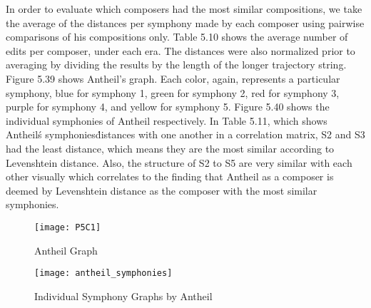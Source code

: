 In order to evaluate which composers had the most similar compositions, we take the average of the distances per symphony made by each composer using pairwise comparisons of his compositions only. Table 5.10 shows the average number of edits per composer, under each era. The distances were also normalized prior to averaging by dividing the results by the length of the longer trajectory string. Figure 5.39 shows Antheil's graph. Each color, again, represents a particular symphony, blue for symphony 1, green for symphony 2, red for symphony 3, purple for symphony 4, and yellow for symphony 5. Figure 5.40 shows the individual symphonies of Antheil respectively. In Table 5.11, which shows Antheil\'s symphonies\' distances with one another in a correlation matrix, S2 and S3 had the least distance, which means they are the most similar according to Levenshtein distance. Also, the structure of S2 to S5 are very similar with each other visually which correlates to the finding that Antheil as a composer is deemed by Levenshtein distance as the composer with the most similar symphonies.

\begin{figure}[H]
\caption{Antheil Graph}
\centering
\texttt{[image: P5C1]}
\end{figure}

\begin{figure}[H]
\caption{Individual Symphony Graphs by Antheil}
\centering
\texttt{[image: antheil\_symphonies]}
\end{figure}

